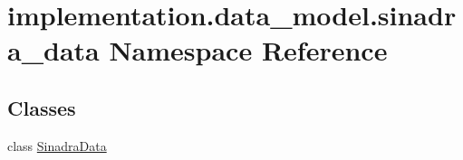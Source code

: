 \hypertarget{namespaceimplementation_1_1data__model_1_1sinadra__data}{}\section{implementation.\+data\+\_\+model.\+sinadra\+\_\+data Namespace Reference}
\label{namespaceimplementation_1_1data__model_1_1sinadra__data}
\subsection*{Classes}
\begin{DoxyCompactItemize}
\item 
class \hyperlink{classimplementation_1_1data__model_1_1sinadra__data_1_1_sinadra_data}{Sinadra\+Data}
\end{DoxyCompactItemize}

